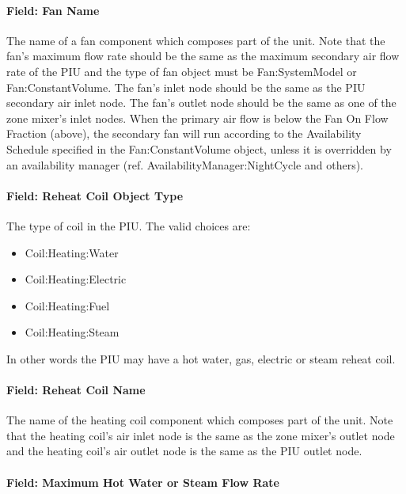 \paragraph{Field: Fan Name}\label{field-fan-name-2}

The name of a fan component which composes part of the unit. Note that the fan's maximum flow rate should be the same as the maximum secondary air flow rate of the PIU and the type of fan object must be Fan:SystemModel or Fan:ConstantVolume. The fan's inlet node should be the same as the PIU secondary air inlet node. The fan's outlet node should be the same as one of the zone mixer's inlet nodes. When the primary air flow is below the Fan On Flow Fraction (above), the secondary fan will run according to the Availability Schedule specified in the Fan:ConstantVolume object, unless it is overridden by an availability manager (ref. AvailabilityManager:NightCycle and others).

\paragraph{Field: Reheat Coil Object Type}\label{field-reheat-coil-object-type-4}

The type of coil in the PIU. The valid choices are:

\begin{itemize}
\item
  Coil:Heating:Water
\item
  Coil:Heating:Electric
\item
  Coil:Heating:Fuel
\item
  Coil:Heating:Steam
\end{itemize}

In other words the PIU may have a hot water, gas, electric or steam reheat coil.

\paragraph{Field: Reheat Coil Name}\label{field-reheat-coil-name-4}

The name of the heating coil component which composes part of the unit. Note that the heating coil's air inlet node is the same as the zone mixer's outlet node and the heating coil's air outlet node is the same as the PIU outlet node.

\paragraph{Field: Maximum Hot Water or Steam Flow Rate}\label{field-maximum-hot-water-or-steam-flow-rate-5}

